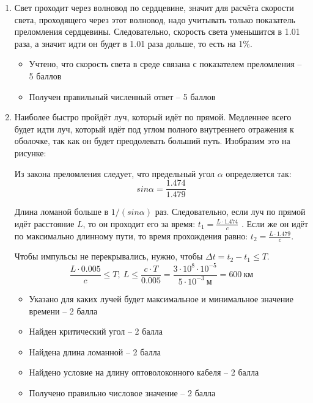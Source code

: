 \solutionSection

\begin{enumerate}
    \item Свет проходит через волновод по сердцевине, значит для расчёта скорости света, проходящего через этот волновод, надо учитывать только показатель преломления сердцевины.  Следовательно, скорость света уменьшится в 1.01 раза, а значит идти он будет в 1.01 раза дольше, то есть на 1\%.
    

    \markSection

    \begin{itemize}
        \item Учтено, что скорость света в среде связана с показателем преломления – 5 баллов
        \item Получен правильный численный ответ – 5 баллов
    \end{itemize}
    
    \item Наиболее быстро пройдёт луч, который идёт по прямой. Медленнее всего будет идти луч, который идёт под углом полного внутреннего отражения к оболочке, так как он будет преодолевать больший путь. Изобразим это на рисунке:
		

		Из закона преломления следует, что предельный угол $\alpha$ определяется так:
		$$sin\alpha=\frac{1.474}{1.479}$$
		
		Длина ломаной больше в $1/(sin\alpha)$ раз. Следовательно, если луч по прямой идёт расстояние $L$, то он проходит его за время: $t_1= \frac{L \cdot 1.474}{c}$ . Если же он идёт по максимально длинному пути, то время прохождения равно: $t_2= \frac{L \cdot 1.479}{c}$.

		Чтобы импульсы не перекрывались, нужно, чтобы $\Delta t=t_2- t_1 \leq T$.
		$$\frac{L \cdot 0.005}{c} \leq T; \: L \leq \frac{c \cdot T}{0.005}=\frac{3 \cdot 10^8 \cdot 10^{-5}}{5 \cdot 10^{-3} \: \text{м}} =600 \: \text{км}$$


		\markSection

		\begin{itemize}
			\item Указано для каких лучей будет максимальное и минимальное значение времени – 2 балла
			\item Найден критический угол – 2 балла
			\item Найдена длина ломанной – 2 балла
			\item Найдено условие на длину оптоволоконного кабеля – 2 балла
			\item Получено правильно числовое значение – 2 балла
		\end{itemize}


\end{enumerate}
